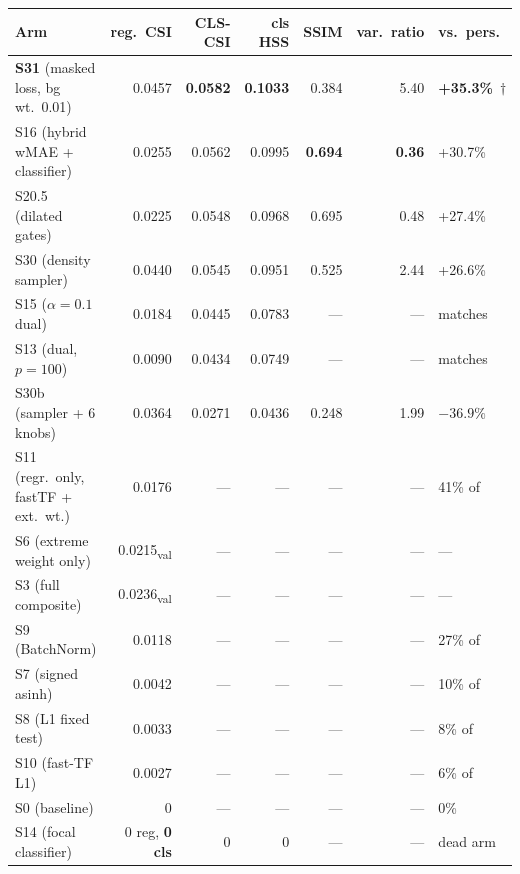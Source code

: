\begin{center}\footnotesize
\setlength{\tabcolsep}{4pt}
\begin{tabular}{l r r r r r l}
\toprule
Arm & reg.\ CSI & CLS-CSI & cls HSS & SSIM & var.\ ratio & vs.\ pers. \\
\midrule
\rowcolor{tabhdr}\textbf{S31} (masked loss, bg wt.\ 0.01)
                                          & 0.0457 & \textbf{0.0582} & \textbf{0.1033} & 0.384 & \textcolor{winred}{5.40} & \textcolor{wingreen}{\textbf{+35.3\%}}~$\dagger$ \\
S16 (hybrid wMAE + classifier)            & 0.0255 & 0.0562 & 0.0995 & \textbf{0.694} & \textbf{0.36} & \textcolor{wingreen}{+30.7\%} \\
S20.5 (dilated gates)                     & 0.0225 & 0.0548 & 0.0968 & 0.695 & 0.48 & \textcolor{wingreen}{+27.4\%} \\
\rowcolor{tabhdr}S30 (density sampler)    & 0.0440 & 0.0545 & 0.0951 & 0.525 & 2.44 & \textcolor{wingreen}{+26.6\%} \\
S15 ($\alpha{=}0.1$ dual)                 & 0.0184 & 0.0445 & 0.0783 & --- & --- & matches \\
\rowcolor{tabhdr}S13 (dual, $p{=}100$)    & 0.0090 & 0.0434 & 0.0749 & --- & --- & matches \\
S30b (sampler + 6 knobs)                  & 0.0364 & 0.0271 & 0.0436 & 0.248 & 1.99 & \textcolor{winred}{$-36.9\%$} \\
S11 (regr.\ only, fastTF + ext.\ wt.)     & 0.0176 & --- & --- & --- & --- & 41\% of \\
S6 (extreme weight only)                  & 0.0215\textsubscript{val} & --- & --- & --- & --- & --- \\
S3 (full composite)                       & 0.0236\textsubscript{val} & --- & --- & --- & --- & --- \\
S9 (BatchNorm)                            & 0.0118 & --- & --- & --- & --- & 27\% of \\
S7 (signed asinh)                         & 0.0042 & --- & --- & --- & --- & 10\% of \\
S8 (L1 fixed test)                        & 0.0033 & --- & --- & --- & --- & 8\% of \\
S10 (fast-TF L1)                          & 0.0027 & --- & --- & --- & --- & 6\% of \\
S0 (baseline)                             & 0      & --- & --- & --- & --- & 0\% \\
S14 (focal classifier)                    & 0 reg, \textbf{0 cls} & 0 & 0 & --- & --- & dead arm \\
\bottomrule
\end{tabular}
\end{center}

